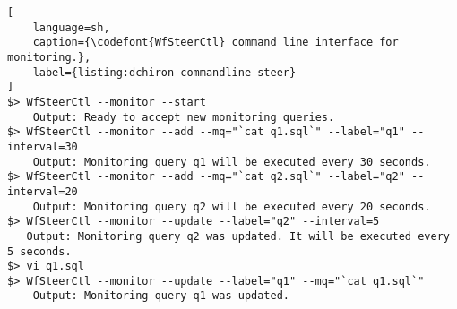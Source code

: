 \noindent\begin{minipage}[t]{1.0\linewidth}
\begin{lstlisting}[
    language=sh,
    caption={\codefont{WfSteerCtl} command line interface for monitoring.},
    label={listing:dchiron-commandline-steer}
]
$> WfSteerCtl --monitor --start
    Output: Ready to accept new monitoring queries.
$> WfSteerCtl --monitor --add --mq="`cat q1.sql`" --label="q1" --interval=30
    Output: Monitoring query q1 will be executed every 30 seconds.
$> WfSteerCtl --monitor --add --mq="`cat q2.sql`" --label="q2" --interval=20
    Output: Monitoring query q2 will be executed every 20 seconds.
$> WfSteerCtl --monitor --update --label="q2" --interval=5
   Output: Monitoring query q2 was updated. It will be executed every 5 seconds.
$> vi q1.sql
$> WfSteerCtl --monitor --update --label="q1" --mq="`cat q1.sql`"
    Output: Monitoring query q1 was updated.

\end{lstlisting}
\end{minipage}
